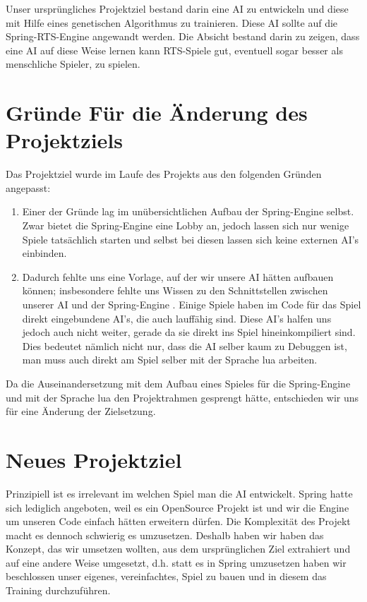 \documentclass[
	12pt,
	a4paper,
	BCOR10mm,
	DIV14,
	headsepline,
	usegeometry,
]{scrreprt}
\begin{document}
Unser ursprüngliches Projektziel bestand darin eine AI zu entwickeln und diese mit Hilfe eines genetischen Algorithmus zu trainieren. Diese AI sollte auf die Spring-RTS-Engine \cite{Spring} angewandt werden. Die Absicht bestand darin zu zeigen, dass eine AI auf diese Weise lernen kann RTS-Spiele gut, eventuell sogar besser als menschliche Spieler, zu spielen.\\

\section{Gründe Für die Änderung des Projektziels}

Das Projektziel wurde im Laufe des Projekts aus den folgenden Gründen angepasst:
\begin{enumerate}
	\item Einer der Gründe lag im unübersichtlichen Aufbau der Spring-Engine \cite{Spring} selbst. 
		Zwar bietet die Spring-Engine eine Lobby an, jedoch lassen sich nur wenige Spiele tatsächlich starten und selbst bei diesen lassen sich keine externen AI's einbinden. 

	\item	Dadurch fehlte uns eine Vorlage, auf der wir unsere AI hätten aufbauen können; insbesondere fehlte uns Wissen zu den Schnittstellen zwischen unserer AI und der Spring-Engine \cite{Spring}.
		Einige Spiele haben im Code für das Spiel direkt eingebundene AI's, die auch lauffähig sind. 
		Diese AI's halfen uns jedoch auch nicht weiter, gerade da sie direkt ins Spiel hineinkompiliert sind. 
		Dies bedeutet nämlich nicht nur, dass die AI selber kaum zu Debuggen ist, man muss auch direkt am Spiel selber mit der Sprache lua arbeiten. 
\end{enumerate}

Da die Auseinandersetzung mit dem Aufbau eines Spieles für die Spring-Engine und mit der Sprache lua den Projektrahmen gesprengt hätte, entschieden wir uns für eine Änderung der Zielsetzung.

\section{Neues Projektziel}
Prinzipiell ist es irrelevant im welchen Spiel man die AI entwickelt. Spring hatte sich lediglich angeboten, weil es ein OpenSource Projekt ist und wir die Engine um unseren Code einfach hätten erweitern dürfen.
Die Komplexität des Projekt macht es dennoch schwierig es umzusetzen.
Deshalb haben wir haben das Konzept, das wir umsetzen wollten, aus dem ursprünglichen Ziel extrahiert und auf eine andere Weise umgesetzt, d.h. statt es in Spring umzusetzen haben wir beschlossen unser eigenes, vereinfachtes, Spiel zu bauen und in diesem das Training durchzuführen.
\end{document}
